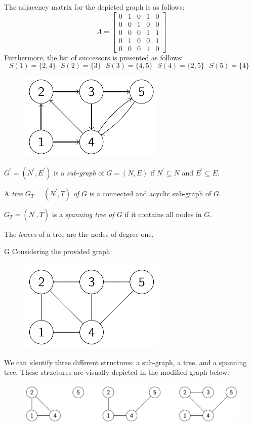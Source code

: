\documentclass[12pt, a4paper]{report}
\begin{document}
    \begin{example}
        The adjacency matrix for the depicted graph is as follows:
        \[A=\begin{bmatrix}
            0 & 1 & 0 & 1 & 0 \\
            0 & 0 & 1 & 0 & 0 \\
            0 & 0 & 0 & 1 & 1 \\
            0 & 1 & 0 & 0 & 1 \\
            0 & 0 & 0 & 1 & 0 
            \end{bmatrix}\]
        Furthermore, the list of successors is presented as follows:
        \[S(1)=\{2,4\} \:\:\: S(2)=\{3\} \:\:\:S(3)=\{4,5\} \:\:\: S(4)=\{2,5\} \:\:\: S(5)=\{4\} \:\:\:\]
        \begin{figure}[H]
            \centering
            \includegraphics[width=0.3\linewidth]{images/graphs.png}
        \end{figure}
    \end{example}
    \begin{definition}
        $G^{'}=(N^{'},E^{'})$ is a \emph{sub-graph} of $G=(N,E)$ if $N^{'} \subseteq N$ and $E^{'} \subseteq E$. 

        A \emph{tree} $G_T=(N^{'},T)$ \emph{of $G$} is a connected and acyclic sub-graph of $G$. 

        $G_T=(N^{'},T)$ is a \emph{spanning tree of $G$} if it contains all nodes in $G$. 

        The \emph{leaves} of a tree are the nodes of degree one. 
    \end{definition}
    \begin{example}G
        Considering the provided graph:
        \begin{figure}[H]
            \centering
            \includegraphics[width=0.3\linewidth]{images/sgraph.png}
        \end{figure}
        We can identify three different structures: a sub-graph, a tree, and a spanning tree. 
        These structures are visually depicted in the modified graph below:
        \begin{figure}[H]
            \centering
            \includegraphics[width=0.8\linewidth]{images/sgraphmod.png}
        \end{figure}
    \end{example}
\end{document}
